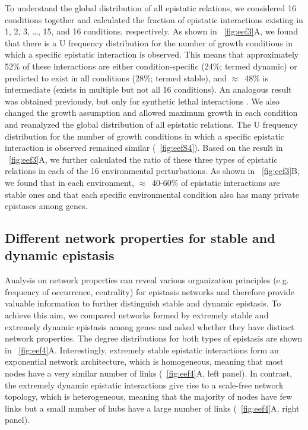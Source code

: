 To understand the global distribution of all epistatic relations, we
considered 16 conditions together and calculated the fraction of
epistatic interactions existing in 1, 2, 3, \ldots, 15, and 16
conditions, respectively. As shown in \Fig~\ref{fig:eef3}A, we found that there is a
U frequency distribution for the number of growth conditions in which
a specific epistatic interaction is observed. This means that
approximately 52\% of these interactions are either condition-specific
(24\%; termed dynamic) or predicted to exist in all conditions (28\%;
termed stable), and $\approx$~48\% is intermediate (exists in multiple but not
all 16 conditions). An analogous result was obtained previously, but
only for synthetic lethal interactions \citep{Harrison2007}. We also changed the
growth assumption and allowed maximum growth in each condition and
reanalyzed the global distribution of all epistatic relations. The U
frequency distribution for the number of growth conditions in which a
specific epistatic interaction is observed remained similar
(\Fig~\ref{fig:eefS4}). Based on the result in \Fig~\ref{fig:eef3}A,
we further calculated the ratio of these three types of epistatic
relations in each of the 16 environmental perturbations. As shown in
\Fig~\ref{fig:eef3}B, we found that in
each environment, $\approx$~40-60\% of epistatic interactions are stable ones
and that each specific environmental condition also has many private
epistases among genes.


\subsection{Different network properties for stable and dynamic epistasis}

Analysis on network properties can reveal various organization
principles (e.g. frequency of occurrence, centrality) for epistasis
networks \citep{Tong2004, Costanzo2010} and therefore provide valuable
information to further
distinguish stable and dynamic epistasis. To achieve this aim, we
compared networks formed by extremely stable and extremely dynamic
epistasis among genes and asked whether they have distinct network
properties. The degree distributions for both types of epistasis are
shown in \Fig~\ref{fig:eef4}A. Interestingly, extremely stable epistatic
interactions form an exponential network architecture, which is
homogeneous, meaning that most nodes have a very similar number of
links (\Fig~\ref{fig:eef4}A, left panel). In contrast, the extremely dynamic
epistatic interactions give rise to a scale-free network topology,
which is heterogeneous, meaning that the majority of nodes have few
links but a small number of hubs have a large number of links
(\Fig~\ref{fig:eef4}A, right panel).

